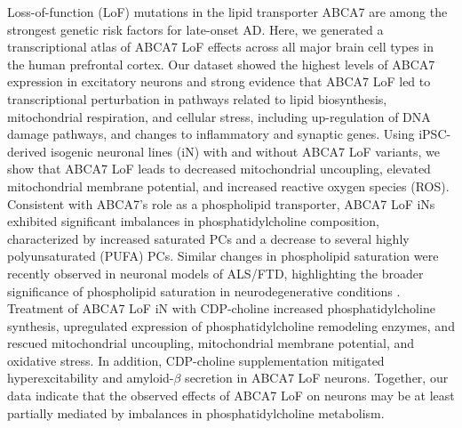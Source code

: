 Loss-of-function (LoF) mutations in the lipid transporter ABCA7 are among the strongest genetic risk factors for late-onset AD. Here, we generated a transcriptional atlas of ABCA7 LoF effects across all major brain cell types in the human prefrontal cortex. Our dataset showed the highest levels of ABCA7 expression in excitatory neurons and strong evidence that ABCA7 LoF led to transcriptional perturbation in pathways related to lipid biosynthesis, mitochondrial respiration, and cellular stress, including up-regulation of DNA damage pathways, and changes to inflammatory and synaptic genes. Using iPSC-derived isogenic neuronal lines (iN) with and without ABCA7 LoF variants, we show that ABCA7 LoF leads to decreased mitochondrial uncoupling, elevated mitochondrial membrane potential, and increased reactive oxygen species (ROS). Consistent with ABCA7’s role as a phospholipid transporter, ABCA7 LoF iNs exhibited significant imbalances in phosphatidylcholine composition, characterized by increased saturated PCs and a decrease to several highly polyunsaturated (PUFA) PCs. Similar changes in phospholipid saturation were recently observed in neuronal models of ALS/FTD, highlighting the broader significance of phospholipid saturation in neurodegenerative conditions \cite{Giblin2025-ri}. Treatment of ABCA7 LoF iN with CDP-choline increased phosphatidylcholine synthesis, upregulated expression of phosphatidylcholine remodeling enzymes, and rescued mitochondrial uncoupling, mitochondrial membrane potential, and oxidative stress. In addition, CDP-choline supplementation mitigated hyperexcitability and amyloid-$\beta$ secretion in ABCA7 LoF neurons. Together, our data indicate that the observed effects of ABCA7 LoF on neurons may be at least partially mediated by imbalances in phosphatidylcholine metabolism. 

